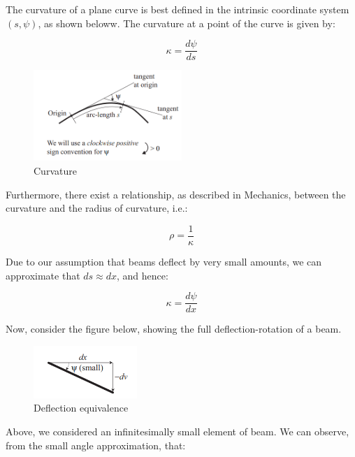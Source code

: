 \documentclass{article}
\begin{document}
\begin{definition}[Curvature]
    The curvature of a plane curve is best defined in the intrinsic coordinate system $(s, \psi)$, as shown beloww. The curvature at a point of the curve is given by:

    \[ \kappa = \frac{d\psi}{ds} \]
\end{definition}

\begin{figure}[h]
    \centering
    \includegraphics[width = 0.5\textwidth]{images/curvature.png}
    \caption{Curvature}
    \label{fig:enter-label}
\end{figure}

Furthermore, there exist a relationship, as described in Mechanics, between the curvature and the radius of curvature, i.e.:

\[ \rho = \frac{1}{\kappa} \] 

\begin{proposition}
    Due to our assumption that beams deflect by very small amounts, we can approximate that $ds \approx dx$, and hence:

    \[ \kappa = \frac{d\psi}{dx} \]
\end{proposition}

Now, consider the figure below, showing the full deflection-rotation of a beam.

\begin{figure}[h]
    \centering
    \includegraphics[width = 0.35\textwidth]{images/deflect.png}
    \caption{Deflection equivalence}
    \label{fig:enter-label}
\end{figure}

Above, we considered an infinitesimally small element of beam. We can observe, from the small angle approximation, that:
\end{document}
